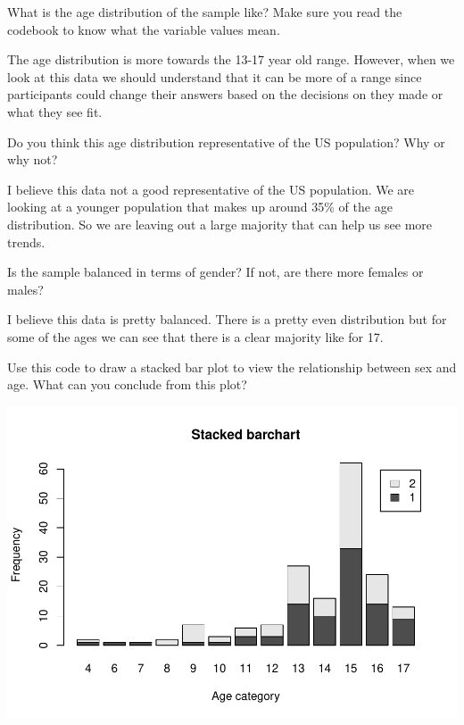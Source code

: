 \documentclass[
]{article}
\newenvironment{Shaded}{\begin{snugshade}}{\end{snugshade}}
\newcommand{\AttributeTok}[1]{\textcolor[rgb]{0.77,0.63,0.00}{#1}}
\newcommand{\CommentTok}[1]{\textcolor[rgb]{0.56,0.35,0.01}{\textit{#1}}}
\newcommand{\ConstantTok}[1]{\textcolor[rgb]{0.00,0.00,0.00}{#1}}
\newcommand{\FunctionTok}[1]{\textcolor[rgb]{0.00,0.00,0.00}{#1}}
\newcommand{\NormalTok}[1]{#1}
\newcommand{\OtherTok}[1]{\textcolor[rgb]{0.56,0.35,0.01}{#1}}
\newcommand{\SpecialCharTok}[1]{\textcolor[rgb]{0.00,0.00,0.00}{#1}}
\newcommand{\StringTok}[1]{\textcolor[rgb]{0.31,0.60,0.02}{#1}}
\begin{document}
What is the age distribution of the sample like? Make sure you read the
codebook to know what the variable values mean.

The age distribution is more towards the 13-17 year old range. However,
when we look at this data we should understand that it can be more of a
range since participants could change their answers based on the
decisions on they made or what they see fit.

Do you think this age distribution representative of the US population?
Why or why not?

I believe this data not a good representative of the US population. We
are looking at a younger population that makes up around 35\% of the age
distribution. So we are leaving out a large majority that can help us
see more trends.

Is the sample balanced in terms of gender? If not, are there more
females or males?

I believe this data is pretty balanced. There is a pretty even
distribution but for some of the ages we can see that there is a clear
majority like for 17.

Use this code to draw a stacked bar plot to view the relationship
between sex and age. What can you conclude from this plot?

\begin{Shaded}
\end{Shaded}

\includegraphics{Journal_files/figure-latex/unnamed-chunk-13-1.pdf}
\end{document}
